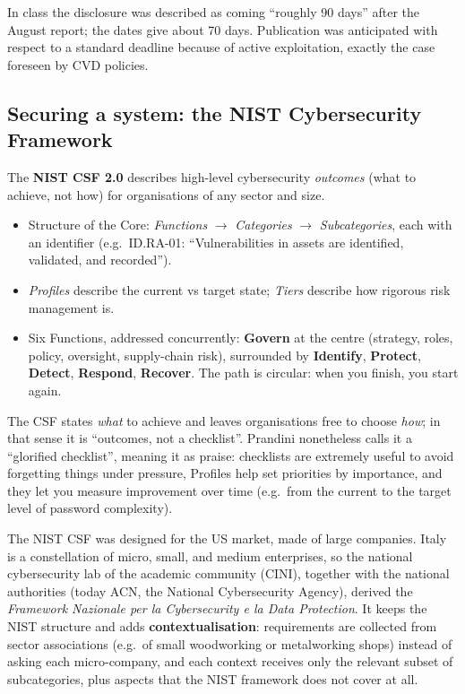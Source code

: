 \begin{remark}
In class the disclosure was described as coming \enquote{roughly 90 days} after the August report; the dates give about 70 days. Publication was anticipated with respect to a standard deadline because of active exploitation, exactly the case foreseen by CVD policies.
\end{remark}

\subsection{Securing a system: the NIST Cybersecurity Framework}

The \textbf{NIST CSF 2.0} \cite{nistcsf2024} describes high-level cybersecurity \emph{outcomes} (what to achieve, not how) for organisations of any sector and size.
\begin{itemize}
    \item Structure of the Core: \emph{Functions} $\to$ \emph{Categories} $\to$ \emph{Subcategories}, each with an identifier (e.g.\ ID.RA-01: \enquote{Vulnerabilities in assets are identified, validated, and recorded}).
    \item \emph{Profiles} describe the current vs target state; \emph{Tiers} describe how rigorous risk management is.
    \item Six Functions, addressed concurrently: \textbf{Govern} at the centre (strategy, roles, policy, oversight, supply-chain risk), surrounded by \textbf{Identify}, \textbf{Protect}, \textbf{Detect}, \textbf{Respond}, \textbf{Recover}. The path is circular: when you finish, you start again.
\end{itemize}

\begin{remark}
The CSF states \emph{what} to achieve and leaves organisations free to choose \emph{how}; in that sense it is \enquote{outcomes, not a checklist}. Prandini nonetheless calls it a \enquote{glorified checklist}, meaning it as praise: checklists are extremely useful to avoid forgetting things under pressure, Profiles help set priorities by importance, and they let you measure improvement over time (e.g.\ from the current to the target level of password complexity).
\end{remark}

\begin{remark}
The NIST CSF was designed for the US market, made of large companies. Italy is a constellation of micro, small, and medium enterprises, so the national cybersecurity lab of the academic community (CINI), together with the national authorities (today ACN, the National Cybersecurity Agency), derived the \emph{Framework Nazionale per la Cybersecurity e la Data Protection}. It keeps the NIST structure and adds \textbf{contextualisation}: requirements are collected from sector associations (e.g.\ of small woodworking or metalworking shops) instead of asking each micro-company, and each context receives only the relevant subset of subcategories, plus aspects that the NIST framework does not cover at all.
\end{remark}

